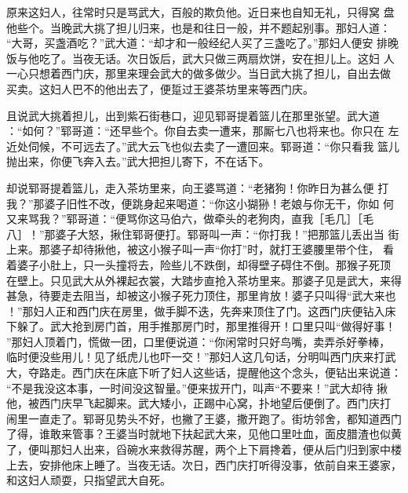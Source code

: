 原来这妇人，往常时只是骂武大，百般的欺负他。近日来也自知无礼，只得窝
盘他些个。当晚武大挑了担儿归来，也是和往日一般，并不题起别事。那妇人道：
“大哥，买盏酒吃？”武大道：“却才和一般经纪人买了三盏吃了。”那妇人便安
排晚饭与他吃了。当夜无话。次日饭后，武大只做三两扇炊饼，安在担儿上。这妇
人一心只想着西门庆，那里来理会武大的做多做少。当日武大挑了担儿，自出去做
买卖。这妇人巴不的他出去了，便踅过王婆茶坊里来等西门庆。

且说武大挑着担儿，出到紫石街巷口，迎见郓哥提着篮儿在那里张望。武大道
：“如何？”郓哥道：“还早些个。你自去卖一遭来，那厮七八也将来也。你只在
左近处伺候，不可远去了。”武大云飞也似去卖了一遭回来。郓哥道：“你只看我
篮儿抛出来，你便飞奔入去。”武大把担儿寄下，不在话下。

却说郓哥提着篮儿，走入茶坊里来，向王婆骂道：“老猪狗！你昨日为甚么便
打我？”那婆子旧性不改，便跳身起来喝道：“你这小猢狲！老娘与你无干，你如
何又来骂我？”郓哥道：“便骂你这马伯六，做牵头的老狗肉，直我［毛几］［毛
八］！”那婆子大怒，揪住郓哥便打。郓哥叫一声：“你打我！”把那篮儿丢出当
街上来。那婆子却待揪他，被这小猴子叫一声“你打”时，就打王婆腰里带个住，
看着婆子小肚上，只一头撞将去，险些儿不跌倒，却得壁子碍住不倒。那猴子死顶
在壁上。只见武大从外裸起衣裳，大踏步直抢入茶坊里来。那婆子见是武大，来得
甚急，待要走去阻当，却被这小猴子死力顶住，那里肯放！婆子只叫得“武大来也
！”那妇人正和西门庆在房里，做手脚不迭，先奔来顶住了门。这西门庆便钻入床
下躲了。武大抢到房门首，用手推那房门时，那里推得开！口里只叫“做得好事！
”那妇人顶着门，慌做一团，口里便说道：“你闲常时只好鸟嘴，卖弄杀好拳棒，
临时便没些用儿！见了纸虎儿也吓一交！”那妇人这几句话，分明叫西门庆来打武
大，夺路走。西门庆在床底下听了妇人这些话，提醒他这个念头，便钻出来说道：
“不是我没这本事，一时间没这智量。”便来拔开门，叫声“不要来！”武大却待
揪他，被西门庆早飞起脚来。武大矮小，正踢中心窝，扑地望后便倒了。西门庆打
闹里一直走了。郓哥见势头不好，也撇了王婆，撒开跑了。街坊邻舍，都知道西门
了得，谁敢来管事？王婆当时就地下扶起武大来，见他口里吐血，面皮腊渣也似黄
了，便叫那妇人出来，舀碗水来救得苏醒，两个上下肩搀着，便从后门归到家中楼
上去，安排他床上睡了。当夜无话。次日，西门庆打听得没事，依前自来王婆家，
和这妇人顽耍，只指望武大自死。


